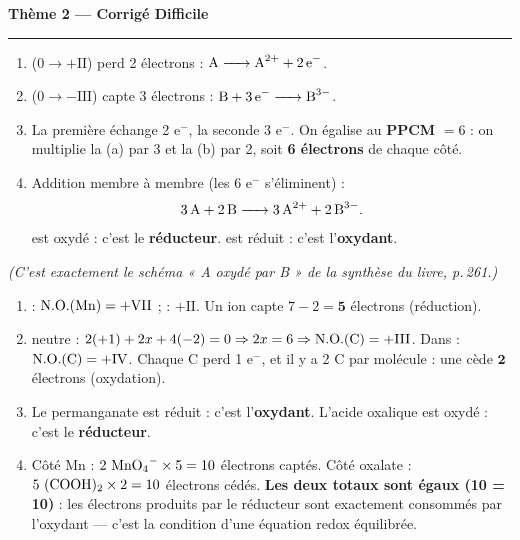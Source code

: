 \documentclass[11pt,a4paper]{article}
\newcommand{\NO}{\ensuremath{\mathrm{N.O.}}}
\begin{document}
\begin{center}
{\LARGE\bfseries\color{primarydark}Thème 2 — Corrigé Difficile}\\[-2pt]
{\color{corrcol}\rule{\textwidth}{1pt}}
\end{center}

\begin{corr}
\begin{enumerate}[label=\textbf{\alph*)},leftmargin=2.2em,topsep=2pt,itemsep=2pt]
  \item {} ($0\to+\mathrm{II}$) perd 2 électrons : $\ce{A -> A^{2+} + 2 e^-}$.
  \item {} ($0\to-\mathrm{III}$) capte 3 électrons : $\ce{B + 3 e^- -> B^{3-}}$.
  \item La première échange 2 e$^-$, la seconde 3 e$^-$. On égalise au \textbf{PPCM} $=6$ : on multiplie
        la (a) par 3 et la (b) par 2, soit \textbf{6 électrons} de chaque côté.
  \item Addition membre à membre (les 6 e$^-$ s'éliminent) :
        \[
        \ce{3 A + 2 B -> 3 A^{2+} + 2 B^{3-}}.
        \]
         est oxydé : c'est le \textbf{réducteur}.  est réduit : c'est l'\textbf{oxydant}.
\end{enumerate}
\emph{(C'est exactement le schéma « A oxydé par B » de la synthèse du livre, p.\,261.)}
\end{corr}

\begin{corr}
\begin{enumerate}[label=\textbf{\alph*)},leftmargin=2.2em,topsep=2pt,itemsep=2pt]
  \item {} : $\NO(\ce{Mn})=+\mathrm{VII}$ ;  : $+\mathrm{II}$.
        Un ion  capte $7-2=\mathbf{5}$ électrons (réduction).
  \item {} neutre : $2(+1)+2x+4(-2)=0 \Rightarrow 2x=6 \Rightarrow \NO(\ce{C})=+\mathrm{III}$.
        Dans  : $\NO(\ce{C})=+\mathrm{IV}$. Chaque C perd 1 e$^-$, et il y a 2 C par molécule :
        une  cède $\mathbf{2}$ électrons (oxydation).
  \item Le permanganate  est réduit : c'est l'\textbf{oxydant}.
        L'acide oxalique  est oxydé : c'est le \textbf{réducteur}.
  \item Côté Mn : $2\ \ce{MnO4^-}\times 5 = 10$ électrons captés.
        Côté oxalate : $5\ \ce{(COOH)2}\times 2 = 10$ électrons cédés.
        \textbf{Les deux totaux sont égaux (10 = 10)} : les électrons produits par le réducteur sont
        exactement consommés par l'oxydant — c'est la condition d'une équation redox équilibrée.
\end{enumerate}
\end{corr}
\end{document}
